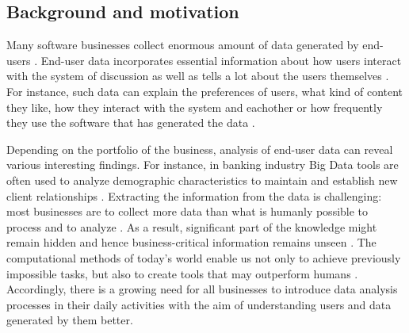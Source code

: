 \subsection{Background and motivation}
    Many software businesses collect enormous amount of data generated by end-users \cite{chinesemobilebankingusers, bigdatamanagementrevolution, inmon2007tapping}. End-user data incorporates essential information about how users interact with the system of discussion as well as tells a lot about the users themselves \cite{jang2015noreciprocity, hu2014we, jang2016teensengagemorewithfewerphotos, han2016teensarefrommars, socialdiversityongithub}. For instance, such data can explain the preferences of users, what kind of content they like, how they interact with the system and eachother or how frequently they use the software that has generated the data \cite{youyou2015computer, ottoni2013ladies}.

    Depending on the portfolio of the business, analysis of end-user data can reveal various interesting findings. For instance, in banking industry Big Data tools are often used to analyze demographic characteristics to maintain and establish new client relationships \cite{chinesemobilebankingusers, bigdatamanagementrevolution}. Extracting the information from the data is challenging: most businesses are to collect more data than what is humanly possible to process and to analyze \cite{inmon2007tapping, wegener2010integrating}. As a result, significant part of the knowledge might remain hidden and hence business-critical information remains unseen \cite{chinesemobilebankingusers, inmon2007tapping, wegener2010integrating, introtodatamining}. The computational methods of today's world enable us not only to achieve previously impossible tasks, but also to create tools that may outperform humans \cite{youyou2015computer}. Accordingly, there is a growing need for all businesses to introduce data analysis processes in their daily activities with the aim of understanding users and data generated by them better.

